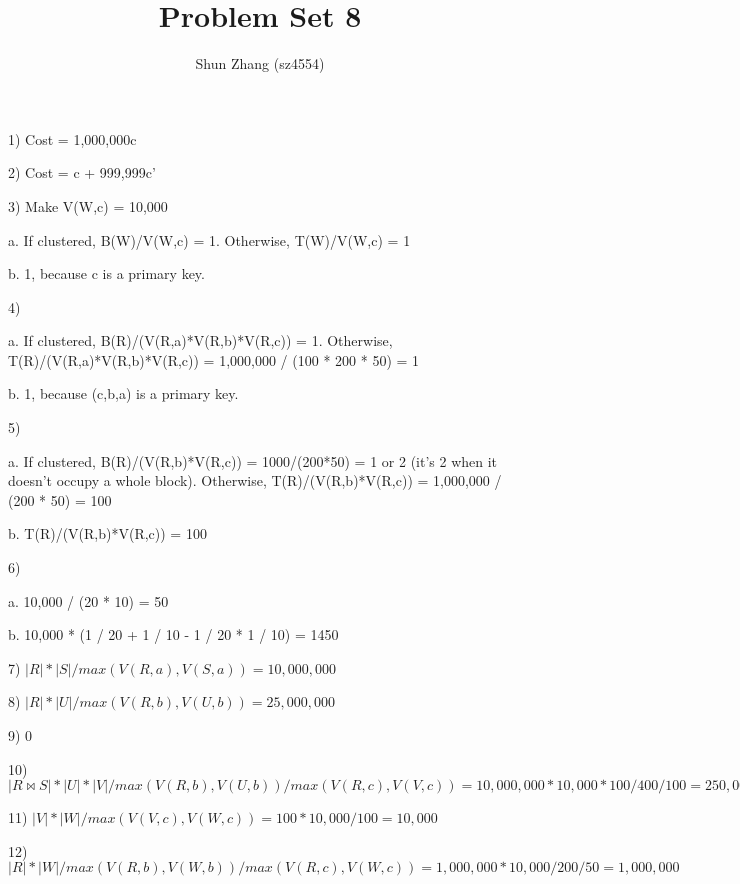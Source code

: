 \documentclass[12pt]{article}
\title{Problem Set 8}
\author{Shun Zhang (sz4554)}
\begin{document}
\maketitle

1) Cost = 1,000,000c

2) Cost = c + 999,999c'

3) Make V(W,c) = 10,000

a. If clustered, B(W)/V(W,c) = 1. Otherwise, T(W)/V(W,c) = 1

b. 1, because c is a primary key.

4)

a. If clustered, B(R)/(V(R,a)*V(R,b)*V(R,c)) = 1. Otherwise, T(R)/(V(R,a)*V(R,b)*V(R,c)) = 1,000,000 / (100 * 200 * 50) = 1

b. 1, because (c,b,a) is a primary key.

5)

a. If clustered, B(R)/(V(R,b)*V(R,c)) = 1000/(200*50) = 1 or 2 (it's 2 when it doesn't occupy a whole block). Otherwise, T(R)/(V(R,b)*V(R,c)) = 1,000,000 / (200 * 50) = 100

b. T(R)/(V(R,b)*V(R,c)) = 100

6)

a. 10,000 / (20 * 10) = 50

b. 10,000 * (1 / 20 + 1 / 10 - 1 / 20 * 1 / 10) = 1450

7) $|R| * |S| / max(V(R,a),V(S,a)) = 10,000,000$

8) $|R| * |U| / max(V(R,b),V(U,b)) = 25,000,000$

9) 0

10) $|R \Join S| * |U| * |V| / max(V(R,b),V(U,b)) / max(V(R,c),V(V,c)) = 10,000,000 * 10,000 * 100 / 400 / 100 = 250,000,000$

11) $|V| * |W| / max(V(V,c),V(W,c)) = 100 * 10,000 / 100 = 10,000$

12) $|R| * |W| / max(V(R,b),V(W,b)) / max(V(R,c),V(W,c)) = 1,000,000 * 10,000 / 200 / 50 = 1,000,000$
\end{document}
